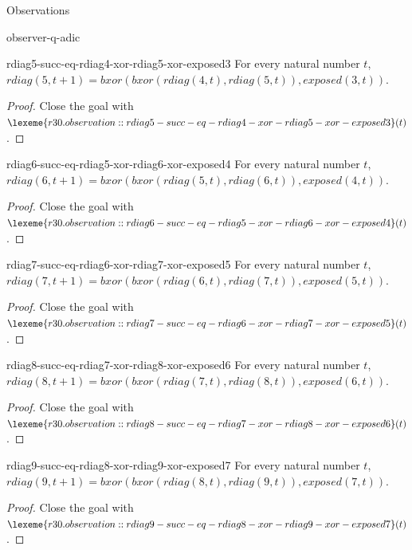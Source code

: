 \begin{lexlean}{Observations}
\begin{section}{observer-q-adic}
\begin{theorem}{rdiag5-succ-eq-rdiag4-xor-rdiag5-xor-exposed3}
For every natural number \(t\), \(rdiag(5, t + 1) = bxor(bxor(rdiag(4, t), rdiag(5, t)), exposed(3, t))\).
\begin{proof}
Close the goal with \(\lexeme{r30.observation::rdiag5-succ-eq-rdiag4-xor-rdiag5-xor-exposed3}(t)\).
\end{proof}
\end{theorem}

\begin{theorem}{rdiag6-succ-eq-rdiag5-xor-rdiag6-xor-exposed4}
For every natural number \(t\), \(rdiag(6, t + 1) = bxor(bxor(rdiag(5, t), rdiag(6, t)), exposed(4, t))\).
\begin{proof}
Close the goal with \(\lexeme{r30.observation::rdiag6-succ-eq-rdiag5-xor-rdiag6-xor-exposed4}(t)\).
\end{proof}
\end{theorem}

\begin{theorem}{rdiag7-succ-eq-rdiag6-xor-rdiag7-xor-exposed5}
For every natural number \(t\), \(rdiag(7, t + 1) = bxor(bxor(rdiag(6, t), rdiag(7, t)), exposed(5, t))\).
\begin{proof}
Close the goal with \(\lexeme{r30.observation::rdiag7-succ-eq-rdiag6-xor-rdiag7-xor-exposed5}(t)\).
\end{proof}
\end{theorem}

\begin{theorem}{rdiag8-succ-eq-rdiag7-xor-rdiag8-xor-exposed6}
For every natural number \(t\), \(rdiag(8, t + 1) = bxor(bxor(rdiag(7, t), rdiag(8, t)), exposed(6, t))\).
\begin{proof}
Close the goal with \(\lexeme{r30.observation::rdiag8-succ-eq-rdiag7-xor-rdiag8-xor-exposed6}(t)\).
\end{proof}
\end{theorem}

\begin{theorem}{rdiag9-succ-eq-rdiag8-xor-rdiag9-xor-exposed7}
For every natural number \(t\), \(rdiag(9, t + 1) = bxor(bxor(rdiag(8, t), rdiag(9, t)), exposed(7, t))\).
\begin{proof}
Close the goal with \(\lexeme{r30.observation::rdiag9-succ-eq-rdiag8-xor-rdiag9-xor-exposed7}(t)\).
\end{proof}
\end{theorem}


\end{section}
\end{lexlean}
